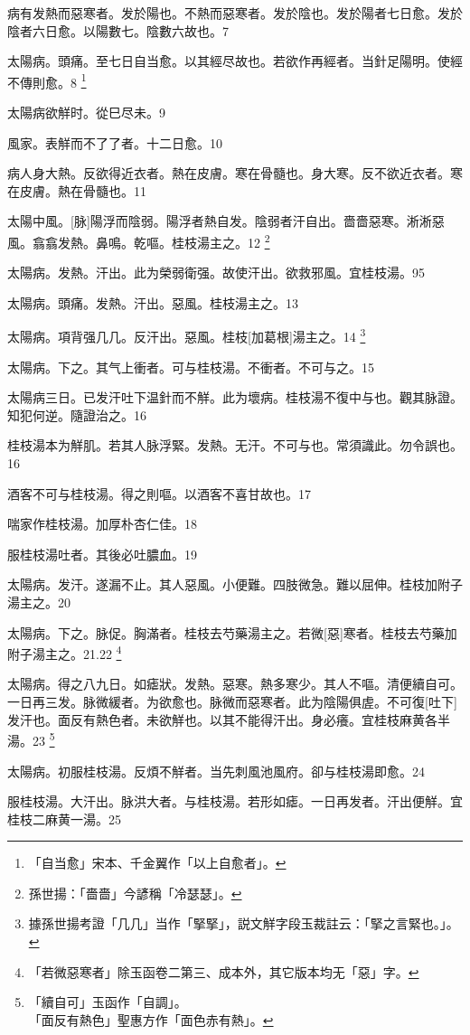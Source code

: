 \documentclass[12pt,twoside,UTF8,b5paper]{ctexbook}
\begin{document}
病有发熱而惡寒者。发於陽也。不熱而惡寒者。发於陰也。发於陽者七日愈。发於陰者六日愈。以陽數七。陰數六故也。7

太陽病。頭痛。至七日自当愈。以其經尽故也。若欲作再經者。当針足陽明。使經不傳則愈。8
	\footnote{「自当愈」宋本、千金翼作「以上自愈者」。}

太陽病欲觧时。從巳尽未。9

風家。表觧而不了了者。十二日愈。10

病人身大熱。反欲得近衣者。熱在皮膚。寒在骨髓也。身大寒。反不欲近衣者。寒在皮膚。熱在骨髓也。11

太陽中風。[脉]陽浮而陰弱。陽浮者熱自发。陰弱者汗自出。嗇嗇惡寒。淅淅惡風。翕翕发熱。鼻鳴。乾嘔。桂枝湯主之。12
	\footnote{孫世揚：「嗇嗇」今諺稱「冷瑟瑟」。}

太陽病。发熱。汗出。此为榮弱衛强。故使汗出。欲救邪風。宜桂枝湯。95

太陽病。頭痛。发熱。汗出。惡風。桂枝湯主之。13

太陽病。項背强几几。反汗出。惡風。桂枝[加葛根]湯主之。14
	\footnote{據孫世揚考證「几几」当作「掔掔」，説文觧字段玉裁註云：「掔之言緊也。」。}

太陽病。下之。其气上衝者。可与桂枝湯。不衝者。不可与之。15

太陽病三日。已发汗吐下温針而不觧。此为壞病。桂枝湯不復中与也。觀其脉證。知犯何逆。隨證治之。16

桂枝湯本为觧肌。若其人脉浮緊。发熱。无汗。不可与也。常須識此。勿令誤也。16

酒客不可与桂枝湯。得之則嘔。以酒客不喜甘故也。17

喘家作桂枝湯。加厚朴杏仁佳。18

服桂枝湯吐者。其後必吐膿血。19

太陽病。发汗。遂漏不止。其人惡風。小便難。四肢微急。難以屈伸。桂枝加附子湯主之。20

太陽病。下之。脉促。胸滿者。桂枝去芍藥湯主之。若微[惡]寒者。桂枝去芍藥加附子湯主之。21.22
	\footnote{「若微惡寒者」除玉函卷二第三、成本外，其它版本均无「惡」字。}


太陽病。得之八九日。如瘧狀。发熱。惡寒。熱多寒少。其人不嘔。清便續自可。一日再三发。脉微緩者。为欲愈也。脉微而惡寒者。此为陰陽俱虗。不可復[吐下]发汗也。面反有熱色者。未欲觧也。以其不能得汗出。身必癢。宜桂枝麻黄各半湯。23
	\footnote{「續自可」玉函作「自調」。\\「面反有熱色」聖惠方作「面色赤有熱」。}

太陽病。初服桂枝湯。反煩不觧者。当先刺風池風府。卻与桂枝湯即愈。24

服桂枝湯。大汗出。脉洪大者。与桂枝湯。若形如瘧。一日再发者。汗出便觧。宜桂枝二麻黄一湯。25
\end{document}
